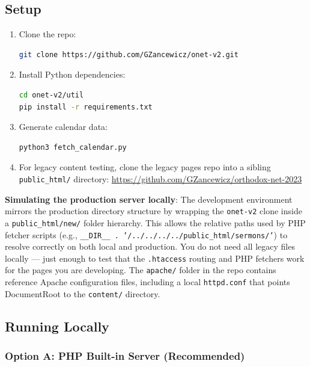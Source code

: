 \documentclass[12pt]{article}
\begin{document}
\subsection{Setup}

\begin{enumerate}
    \item Clone the repo:
\begin{lstlisting}[language=bash,numbers=none]
git clone https://github.com/GZancewicz/onet-v2.git
\end{lstlisting}
    \item Install Python dependencies:
\begin{lstlisting}[language=bash,numbers=none]
cd onet-v2/util
pip install -r requirements.txt
\end{lstlisting}
    \item Generate calendar data:
\begin{lstlisting}[language=bash,numbers=none]
python3 fetch_calendar.py
\end{lstlisting}
    \item For legacy content testing, clone the legacy pages repo into a sibling \texttt{public\_html/} directory: \url{https://github.com/GZancewicz/orthodox-net-2023}
\end{enumerate}

\textbf{Simulating the production server locally}: The development environment mirrors the production directory structure by wrapping the \texttt{onet-v2} clone inside a \texttt{public\_html/new/} folder hierarchy. This allows the relative paths used by PHP fetcher scripts (e.g., \texttt{\_\_DIR\_\_ . '/../../../../public\_html/sermons/'}) to resolve correctly on both local and production. You do not need all legacy files locally --- just enough to test that the \texttt{.htaccess} routing and PHP fetchers work for the pages you are developing. The \texttt{apache/} folder in the repo contains reference Apache configuration files, including a local \texttt{httpd.conf} that points DocumentRoot to the \texttt{content/} directory.

\subsection{Running Locally}

\subsubsection{Option A: PHP Built-in Server (Recommended)}
\end{document}
